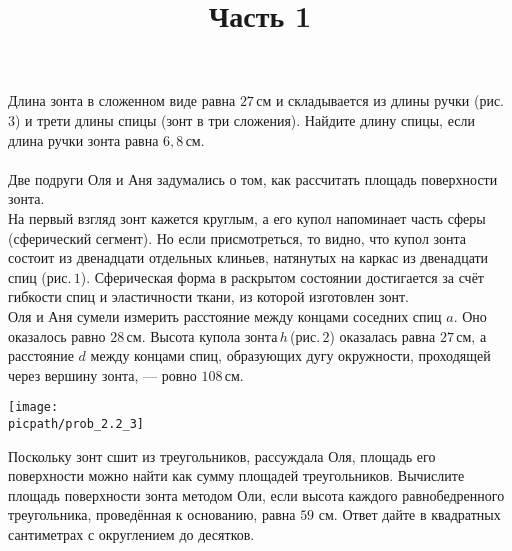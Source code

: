 \begin{training}[2]
	\title{Часть 1}
	\begin{listofex}
		\item
		Длина зонта в сложенном виде равна \( 27 \) см и складывается из длины ручки (рис. \( 3 \)) и трети длины спицы (зонт в три сложения). Найдите длину спицы, если длина ручки зонта равна \( 6,8 \) см.\\\\
		Две подруги Оля и Аня задумались о том, как рассчитать площадь поверхности зонта.\\
		На первый взгляд зонт кажется круглым, а его купол напоминает часть сферы (сферический сегмент). Но если присмотреться, то видно, что купол зонта состоит из двенадцати отдельных клиньев, натянутых на каркас из двенадцати спиц (рис. \( 1 \)). Сферическая форма в раскрытом состоянии достигается за счёт гибкости спиц и эластичности ткани, из которой изготовлен зонт.\\
		Оля и Аня сумели измерить расстояние между концами соседних спиц \( a \). Оно оказалось равно \( 28 \) см. Высота купола зонта \( h \) (рис. \( 2 \)) оказалась равна \( 27 \) см, а расстояние \( d \) между концами спиц, образующих дугу окружности, проходящей через вершину зонта, --- ровно \( 108 \) см.
			\foranswer
		\gapwidth
		\begin{center}
			\texttt{[image: \\picpath/prob\_2.2\_3]}
		\end{center}
		\foranswer
		\item
		Поскольку зонт сшит из треугольников, рассуждала Оля, площадь его поверхности можно найти как сумму площадей треугольников. Вычислите площадь поверхности зонта методом Оли, если высота каждого равнобедренного треугольника, проведённая к основанию, равна \( 59 \) см. Ответ дайте в квадратных сантиметрах с округлением до десятков.
		\foranswer
		

\end{listofex}
\end{training}
